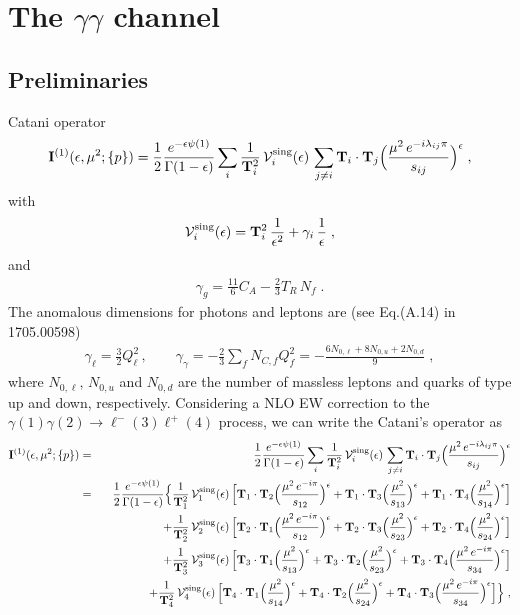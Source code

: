 \documentclass[12pt,a4paper]{article}
\newcommand{\nn}{\nonumber}
\newcommand{\eps}{\epsilon}
\newcommand{\beq}{\begin{eqnarray}}
\newcommand{\eeq}{\end{eqnarray}}
\begin{document}
\section{The $\gamma \gamma$ channel}

\subsection{Preliminaries}
Catani operator
\beq
\mathbf{I}^{(1)}(\eps, \mu^2; \{p\})
=
\frac12 \frac{e^{-\eps \psi(1)}}{\Gamma(1-\eps)}
\sum_{i} \frac{1}{\mathbf{T}^2_i} \, 
\mathcal{V}_i^{\rm sing}(\eps) \, 
\sum_{j \neq i}
\mathbf{T}_i \cdot \mathbf{T}_j
\Big( \frac{\mu^2 \, e^{-i \lambda_{ij} \pi}}{s_{ij}}\Big)^{\eps} \; ,
\eeq
with
\beq
\mathcal{V}_i^{\rm sing}(\eps) = 
\mathbf{T}_i^2 \, \frac1{\eps^2}
+ \gamma_i \, \frac1\eps \; ,
\eeq
and
\beq
\gamma_g = \frac{11}{6}C_A -\frac23 T_R \, N_f \; .
\eeq
The anomalous dimensions for photons and leptons are (see Eq.(A.14) in 1705.00598)
\beq
\gamma_\ell = \frac{3}{2} Q_\ell^2 \, , 
\qquad
\gamma_\gamma = -\frac23 \sum_f N_{C,f} Q_f^2
= - \frac{6 N_{0,\ell} + 8 N_{0,u} + 2 N_{0,d}}{9} \; ,
\eeq
where $N_{0,\ell}, \, N_{0,u}$ and $N_{0,d}$ are the number of massless leptons and quarks of type up and down, respectively.
Considering a NLO EW correction to the $\gamma(1) \gamma(2) \rightarrow \ell^-(3) \ell^+(4)$ process, we can write the Catani's operator as
\beq
\mathbf{I}^{(1)}(\eps, \mu^2; \{p\})
&=&
\frac12 \frac{e^{-\eps \psi(1)}}{\Gamma(1-\eps)}
\sum_{i} \frac{1}{\mathbf{T}^2_i} \, 
\mathcal{V}_i^{\rm sing}(\eps) \, 
\sum_{j \neq i}
\mathbf{T}_i \cdot \mathbf{T}_j
\Big( \frac{\mu^2 \, e^{-i \lambda_{ij} \pi}}{s_{ij}}\Big)^{\eps}
\nn \\
&=&
\frac12 \frac{e^{-\eps \psi(1)}}{\Gamma(1-\eps)}
\Big\{
\frac{1}{\mathbf{T}^2_1} \, 
\mathcal{V}_1^{\rm sing}(\eps) \, 
\Big[
\mathbf{T}_1 \cdot \mathbf{T}_2
\Big( \frac{\mu^2 \, e^{-i \pi}}{s_{12}}\Big)^{\eps}
+ 
\mathbf{T}_1 \cdot \mathbf{T}_3
\Big( \frac{\mu^2 }{s_{13}}\Big)^{\eps}
+ 
\mathbf{T}_1 \cdot \mathbf{T}_4
\Big( \frac{\mu^2 }{s_{14}}\Big)^{\eps}
\Big]
\nn \\
&& \qquad \qquad 
+ 
\frac{1}{\mathbf{T}^2_2} \, 
\mathcal{V}_2^{\rm sing}(\eps) \, 
\Big[
\mathbf{T}_2 \cdot \mathbf{T}_1
\Big( \frac{\mu^2 \, e^{-i \pi}}{s_{12}}\Big)^{\eps}
+ 
\mathbf{T}_2 \cdot \mathbf{T}_3
\Big( \frac{\mu^2 }{s_{23}}\Big)^{\eps}
+ 
\mathbf{T}_2 \cdot \mathbf{T}_4
\Big( \frac{\mu^2 }{s_{24}}\Big)^{\eps}
\Big]
\nn \\
&& \qquad \qquad 
+ 
\frac{1}{\mathbf{T}^2_3} \, 
\mathcal{V}_3^{\rm sing}(\eps) \, 
\Big[
\mathbf{T}_3 \cdot \mathbf{T}_1
\Big( \frac{\mu^2 }{s_{13}}\Big)^{\eps}
+ 
\mathbf{T}_3 \cdot \mathbf{T}_2
\Big( \frac{\mu^2}{s_{23}}\Big)^{\eps}
+ 
\mathbf{T}_3 \cdot \mathbf{T}_4
\Big( \frac{\mu^2 \, e^{-i \pi}}{s_{34}}\Big)^{\eps}
\Big]
\nn \\
&& \qquad \qquad 
+ 
\frac{1}{\mathbf{T}^2_4} \, 
\mathcal{V}_4^{\rm sing}(\eps) \, 
\Big[
\mathbf{T}_4 \cdot \mathbf{T}_1
\Big( \frac{\mu^2 }{s_{14}}\Big)^{\eps}
+ 
\mathbf{T}_4 \cdot \mathbf{T}_2
\Big( \frac{\mu^2}{s_{24}}\Big)^{\eps}
+ 
\mathbf{T}_4 \cdot \mathbf{T}_3
\Big( \frac{\mu^2 \, e^{-i \pi}}{s_{34}}\Big)^{\eps}
\Big]
\Big\} 
\; ,
\eeq
\end{document}
